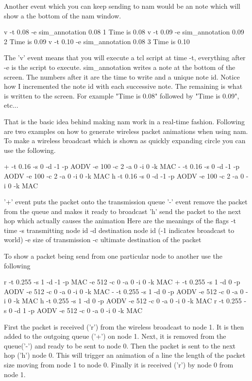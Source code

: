 Another event which you can keep sending to nam would be an note which
will show a the bottom of the nam window.
\begin{program}
v -t 0.08 -e sim\_annotation 0.08 1 Time is 0.08
v -t 0.09 -e sim\_annotation 0.09 2 Time is 0.09
v -t 0.10 -e sim\_annotation 0.08 3 Time is 0.10
\end{program}

The 'v' event means that you will execute a tcl script at time -t,
everything after -e is the script to execute.  sim\_annotation writes a
note at the bottom of the screen.  The numbers after it are the time to
write and a unique note id.  Notice how I incremented the note id with
each successive note.   The remaining is what is written to the screen.
For example "Time is 0.08" followed by "Time is 0.09", etc...

That is the basic idea behind making nam work in a real-time fashion.
Following are two examples on how to generate wireless packet animations
when using nam.  To make a wireless broadcast which is shown as quickly
expanding circle you can use the following.

\begin{program}
+ -t 0.16 -s 0 -d -1 -p AODV -e 100 -c 2 -a 0 -i 0 -k MAC
- -t 0.16 -s 0 -d -1 -p AODV -e 100 -c 2 -a 0 -i 0 -k MAC
h -t 0.16 -s 0 -d -1 -p AODV -e 100 -c 2 -a 0 -i 0 -k MAC
\end{program}

'+' event puts the packet onto the transmission queue
'-' event remove the packet from the queue and makes it ready to
broadcast
'h' send the packet to the next hop which actually causes the animation
Here are the meanings of the flags
  -t time
  -s transmitting node id
  -d destination node id (-1 indicates broadcast to world)
  -e size of transmission
  -c ultimate destination of the packet

To show a packet being send from one particular node to another use the
following

\begin{program}
r -t 0.255 -s 1 -d -1 -p MAC -e 512 -c 0 -a 0 -i 0 -k MAC
+ -t 0.255 -s 1 -d 0 -p AODV -e 512 -c 0 -a 0 -i 0 -k MAC
- -t 0.255 -s 1 -d 0 -p AODV -e 512 -c 0 -a 0 -i 0 -k MAC
h -t 0.255 -s 1 -d 0 -p AODV -e 512 -c 0 -a 0 -i 0 -k MAC
r -t 0.255 -s 0 -d 1 -p AODV -e 512 -c 0 -a 0 -i 0 -k MAC
\end{program}

First the packet is received ('r') from the wireless broadcast to node
1.  It is then added to the outgoing queue ('+') on node 1.  Next, it is
removed from the queue('-') and ready to be sent to node 0.  Then the
packet is sent to the next hop ('h') node 0.  This will trigger an
animation of a line the length of the packet size moving from node 1 to
node 0.  Finally it is received ('r') by node 0 from node 1.

